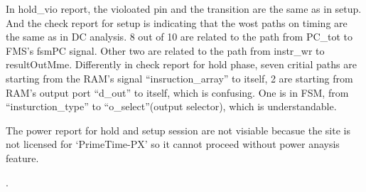 In hold\_vio report, the violoated pin and the transition are the same as in setup. 
And the check report for setup is indicating that the wost paths on timing are the same as in DC analysis.
8 out of 10 are related to the path from PC\_tot to FMS's fsmPC signal.  Other two are related to the path from
instr\_wr to resultOutMme.
Differently in check report for hold phase, seven critial paths are starting from the RAM's signal ``insruction\_array'' to itself, 2 are starting from RAM's output port ``d\_out'' 
 to itself, which is confusing. 
One is in FSM, from ``insturction\_type'' to ``o\_select''(output selector), which is understandable.


The power report for hold and setup session are not visiable becasue the site is not licensed for `PrimeTime-PX'
so it cannot proceed without power anaysis feature.


\cite{Godoy_2012}. 
%




